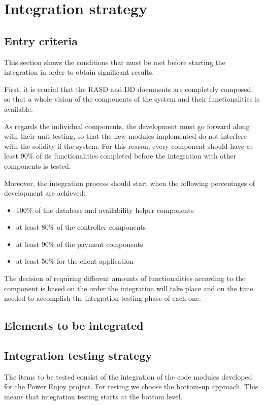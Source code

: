 \chapter{Integration strategy}

\section{Entry criteria}
This section shows the conditions that must be met before starting the integration in order to obtain significant results.

First, it is crucial that the RASD and DD documents are completely composed, so that a whole vision of the components of the system and their functionalities is available.

As regards the individual components, the development must go forward along with their unit testing, so that the new modules implemented do not interfere with the solidity if the system. For this reason, every component should have at least 90\% of its functionalities completed before the integration with other components is tested.

Moreover, the integration process should start when the following percentages of development are achieved:
\begin{itemize}
	\item 100\% of the database and availability helper components
	\item at least 80\% of the controller components
	\item at least 90\% of the payment components
	\item at least 50\% for the client application
\end{itemize}

The decision of requiring different amounts of functionalities according to the component is based on the order the integration will take place and on the time needed to accomplish the integration testing phase of each one.

\section{Elements to be integrated}

\section{Integration testing strategy}
The items to be tested consist of the integration of the code modules developed for the Power Enjoy project. For testing we choose the bottom-up approach. This means that integration testing starts at the bottom level.

